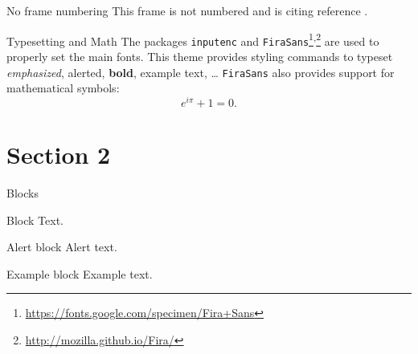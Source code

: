 \documentclass{beamer}
\begin{document}
    \begin{frame}[noframenumbering]{No frame numbering}
        This frame is not numbered and is citing reference \cite{knuth74}.
    \end{frame}

    \begin{frame}{Typesetting and Math}
        The packages \texttt{inputenc} and \texttt{FiraSans}\footnote{\url{https://fonts.google.com/specimen/Fira+Sans}}\textsuperscript{,}\footnote{\url{http://mozilla.github.io/Fira/}} are used to properly set the main fonts.
        \vfill
        This theme provides styling commands to typeset \emph{emphasized}, \alert{alerted}, \textbf{bold}, \textcolor{example}{example text}, \dots
        \vfill
        \texttt{FiraSans} also provides support for mathematical symbols:
        \begin{equation*}
            e^{i\pi} + 1 = 0.
        \end{equation*}
    \end{frame}

    \section{Section 2}
    \begin{frame}{Blocks}
        \begin{block}{Block}
            Text.
        \end{block}
        \pause
        \begin{alertblock}{Alert block}
            Alert \alert{text}.
        \end{alertblock}
        \pause
        \begin{exampleblock}{Example block}
            Example \textcolor{example}{text}.
        \end{exampleblock}
    \end{frame}
\end{document}
